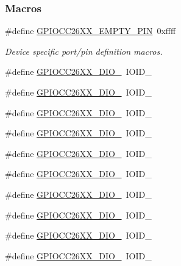 \subsubsection*{Macros}
\begin{DoxyCompactItemize}
\item 
\#define \hyperlink{_g_p_i_o_c_c26_x_x_8h_afd3a36893f287868e89f52ad3028647e}{G\+P\+I\+O\+C\+C26\+X\+X\+\_\+\+E\+M\+P\+T\+Y\+\_\+\+P\+I\+N}~0xffff
\begin{DoxyCompactList}\small\item\em Device specific port/pin definition macros. \end{DoxyCompactList}\item 
\#define \hyperlink{_g_p_i_o_c_c26_x_x_8h_a9df90ec187763683c4eaed593d358013}{G\+P\+I\+O\+C\+C26\+X\+X\+\_\+\+D\+I\+O\+\_}~I\+O\+I\+D\+\_
\item 
\#define \hyperlink{_g_p_i_o_c_c26_x_x_8h_a1517f769b85937467831948da88a2f7a}{G\+P\+I\+O\+C\+C26\+X\+X\+\_\+\+D\+I\+O\+\_}~I\+O\+I\+D\+\_
\item 
\#define \hyperlink{_g_p_i_o_c_c26_x_x_8h_a8135b039ec5e330acf6e3d8537d60855}{G\+P\+I\+O\+C\+C26\+X\+X\+\_\+\+D\+I\+O\+\_}~I\+O\+I\+D\+\_
\item 
\#define \hyperlink{_g_p_i_o_c_c26_x_x_8h_a4aaed6f9970315406d6e336070e454b5}{G\+P\+I\+O\+C\+C26\+X\+X\+\_\+\+D\+I\+O\+\_}~I\+O\+I\+D\+\_
\item 
\#define \hyperlink{_g_p_i_o_c_c26_x_x_8h_a26c4d3e65c836464a5eb0ed82a81f20c}{G\+P\+I\+O\+C\+C26\+X\+X\+\_\+\+D\+I\+O\+\_}~I\+O\+I\+D\+\_
\item 
\#define \hyperlink{_g_p_i_o_c_c26_x_x_8h_aeabbc647f451d8e38122cf4090340d0e}{G\+P\+I\+O\+C\+C26\+X\+X\+\_\+\+D\+I\+O\+\_}~I\+O\+I\+D\+\_
\item 
\#define \hyperlink{_g_p_i_o_c_c26_x_x_8h_a77f186ae066398a90eeb509b36669dff}{G\+P\+I\+O\+C\+C26\+X\+X\+\_\+\+D\+I\+O\+\_}~I\+O\+I\+D\+\_
\item 
\#define \hyperlink{_g_p_i_o_c_c26_x_x_8h_add55f5a414e365f598b70a82f6702c6f}{G\+P\+I\+O\+C\+C26\+X\+X\+\_\+\+D\+I\+O\+\_}~I\+O\+I\+D\+\_
\item 
\#define \hyperlink{_g_p_i_o_c_c26_x_x_8h_acda8042974ed48b7c2a443194fc38abb}{G\+P\+I\+O\+C\+C26\+X\+X\+\_\+\+D\+I\+O\+\_}~I\+O\+I\+D\+\_
\item 
\#define \hyperlink{_g_p_i_o_c_c26_x_x_8h_a05f52fde8069fcf0cfb2d402f66059eb}{G\+P\+I\+O\+C\+C26\+X\+X\+\_\+\+D\+I\+O\+\_}~I\+O\+I\+D\+\_
\item 

\end{DoxyCompactItemize}
